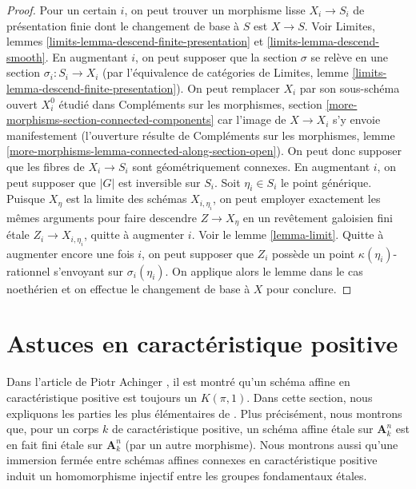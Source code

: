 \begin{proof}
\medskip\noindent
Pour un certain $i$, on peut trouver un morphisme lisse $X_i \to S_i$
de présentation finie dont le changement de base à $S$ est $X \to S$.
Voir Limites, lemmes
\ref{limits-lemma-descend-finite-presentation} et
\ref{limits-lemma-descend-smooth}.
En augmentant $i$, on peut supposer que la section
$\sigma$ se relève en une section $\sigma_i : S_i \to X_i$
(par l'équivalence de catégories de
Limites, lemme \ref{limits-lemma-descend-finite-presentation}).
On peut remplacer $X_i$ par son sous-schéma ouvert $X_i^0$
étudié dans Compléments sur les morphismes, section
\ref{more-morphisms-section-connected-components}
car l'image de $X \to X_i$ s'y envoie manifestement
(l'ouverture résulte de Compléments sur les morphismes, lemme
\ref{more-morphisms-lemma-connected-along-section-open}).
On peut donc supposer que les fibres de $X_i \to S_i$ sont
géométriquement connexes.
En augmentant $i$, on peut supposer que $|G|$ est inversible
sur $S_i$.
Soit $\eta_i \in S_i$ le point générique.
Puisque $X_\eta$ est la limite des schémas
$X_{i, \eta_i}$, on peut employer exactement les mêmes arguments
pour faire descendre $Z \to X_\eta$ en un revêtement galoisien fini \'etale
$Z_i \to X_{i, \eta_i}$, quitte à augmenter $i$.
Voir le lemme \ref{lemma-limit}.
Quitte à augmenter encore une fois $i$, on peut
supposer que $Z_i$ possède un point $\kappa(\eta_i)$-rationnel
s'envoyant sur $\sigma_i(\eta_i)$.
On applique alors le lemme dans le cas noethérien
et on effectue le changement de base à $X$ pour conclure.
\end{proof}











\section{Astuces en caractéristique positive}
\label{section-achinger}

\noindent
Dans l'article de Piotr Achinger \cite{Achinger}, il est montré qu'un
schéma affine en caractéristique positive est toujours un $K(\pi, 1)$.
Dans cette section, nous expliquons les parties les plus élémentaires de \cite{Achinger}.
Plus précisément, nous montrons que, pour un corps $k$ de caractéristique positive,
un schéma affine \'etale sur $\mathbf{A}^n_k$ est en fait fini \'etale
sur $\mathbf{A}^n_k$ (par un autre morphisme). Nous montrons aussi
qu'une immersion fermée entre schémas affines connexes
en caractéristique positive induit un homomorphisme injectif entre les
groupes fondamentaux \'etales.


